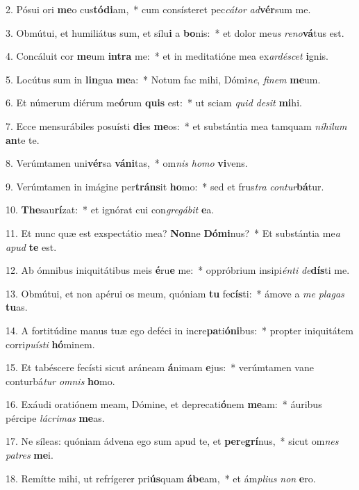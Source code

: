 2. Pósui ori \textbf{me}o cus\textbf{tó}\textbf{di}am,~*  cum consísteret pec\textit{cá}\textit{tor} \textit{ad}\textbf{vér}sum me.\

3. Obmútui, et humiliátus sum, et sílu\textbf{i} a \textbf{bo}nis:~*  et dolor me\textit{us} \textit{re}\textit{no}\textbf{vá}tus est.\

4. Concáluit cor \textbf{me}um \textbf{in}\textbf{tra} me:~*  et in meditatióne mea ex\textit{ar}\textit{dé}\textit{scet} \textbf{i}gnis.\

5. Locútus sum in \textbf{lin}gua \textbf{me}a:~*  Notum fac mihi, Dómi\textit{ne}, \textit{fi}\textit{nem} \textbf{me}um.\

6. Et númerum diérum me\textbf{ó}rum \textbf{quis} est:~*  ut sciam \textit{quid} \textit{de}\textit{sit} \textbf{mi}hi.\

7. Ecce mensurábiles posuísti \textbf{di}es \textbf{me}os:~*  et substántia mea tamquam \textit{ní}\textit{hi}\textit{lum} \textbf{an}te te.\

8. Verúmtamen uni\textbf{vér}sa \textbf{vá}\textbf{ni}tas,~*  om\textit{nis} \textit{ho}\textit{mo} \textbf{vi}vens.\

9. Verúmtamen in imágine per\textbf{tráns}it \textbf{ho}mo:~*  sed et frus\textit{tra} \textit{con}\textit{tur}\textbf{bá}tur.\

10. \textbf{The}sau\textbf{rí}zat:~*  et ignórat cui con\textit{gre}\textit{gá}\textit{bit} \textbf{e}a.\

11. Et nunc quæ est exspectátio mea? \textbf{Non}ne \textbf{Dó}\textbf{mi}nus?~*  Et substántia me\textit{a} \textit{a}\textit{pud} \textbf{te} est.\

12. Ab ómnibus iniquitátibus meis \textbf{é}ru\textbf{e} me:~*  oppróbrium insipi\textit{én}\textit{ti} \textit{de}\textbf{dís}ti me.\

13. Obmútui, et non apérui os meum, quóniam \textbf{tu} fe\textbf{cís}ti:~*  ámove a \textit{me} \textit{pla}\textit{gas} \textbf{tu}as.\

14. A fortitúdine manus tuæ ego deféci in incre\textbf{pa}ti\textbf{ó}\textbf{ni}bus:~*  propter iniquitátem corri\textit{pu}\textit{ís}\textit{ti} \textbf{hó}minem.\

15. Et tabéscere fecísti sicut aráneam \textbf{á}nimam \textbf{e}jus:~*  verúmtamen vane conturbá\textit{tur} \textit{om}\textit{nis} \textbf{ho}mo.\

16. Exáudi oratiónem meam, Dómine, et deprecati\textbf{ó}nem \textbf{me}am:~*  áuribus pércipe \textit{lá}\textit{cri}\textit{mas} \textbf{me}as.\

17. Ne síleas: quóniam ádvena ego sum apud te, et \textbf{per}e\textbf{grí}nus,~*  sicut om\textit{nes} \textit{pa}\textit{tres} \textbf{me}i.\

18. Remítte mihi, ut refrígerer pri\textbf{ús}quam \textbf{á}\textbf{be}am,~*  et ám\textit{pli}\textit{us} \textit{non} \textbf{e}ro.\

